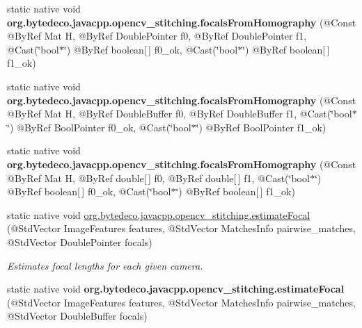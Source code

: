 \begin{DoxyCompactItemize}
static native void {\bfseries org.\+bytedeco.\+javacpp.\+opencv\+\_\+stitching.\+focals\+From\+Homography} (@Const @By\+Ref Mat H, @By\+Ref Double\+Pointer f0, @By\+Ref Double\+Pointer f1, @Cast(\char`\"{}bool$\ast$\char`\"{}) @By\+Ref boolean\mbox{[}$\,$\mbox{]} f0\+\_\+ok, @Cast(\char`\"{}bool$\ast$\char`\"{}) @By\+Ref boolean\mbox{[}$\,$\mbox{]} f1\+\_\+ok)
\item 
\mbox{\label{group__stitching__autocalib_gafa29da1319ecdb20e635b02ee21b11b6}} 
static native void {\bfseries org.\+bytedeco.\+javacpp.\+opencv\+\_\+stitching.\+focals\+From\+Homography} (@Const @By\+Ref Mat H, @By\+Ref Double\+Buffer f0, @By\+Ref Double\+Buffer f1, @Cast(\char`\"{}bool$\ast$\char`\"{}) @By\+Ref Bool\+Pointer f0\+\_\+ok, @Cast(\char`\"{}bool$\ast$\char`\"{}) @By\+Ref Bool\+Pointer f1\+\_\+ok)
\item 
\mbox{\label{group__stitching__autocalib_gaedbd40d8f939bbd801b1418c72eea13d}} 
static native void {\bfseries org.\+bytedeco.\+javacpp.\+opencv\+\_\+stitching.\+focals\+From\+Homography} (@Const @By\+Ref Mat H, @By\+Ref double\mbox{[}$\,$\mbox{]} f0, @By\+Ref double\mbox{[}$\,$\mbox{]} f1, @Cast(\char`\"{}bool$\ast$\char`\"{}) @By\+Ref boolean\mbox{[}$\,$\mbox{]} f0\+\_\+ok, @Cast(\char`\"{}bool$\ast$\char`\"{}) @By\+Ref boolean\mbox{[}$\,$\mbox{]} f1\+\_\+ok)
\item 
static native void \hyperlink{group__stitching__autocalib_gab7c6c88fc60a136eb6f9faa46a32e660}{org.\+bytedeco.\+javacpp.\+opencv\+\_\+stitching.\+estimate\+Focal} (@Std\+Vector Image\+Features features, @Std\+Vector Matches\+Info pairwise\+\_\+matches, @Std\+Vector Double\+Pointer focals)
\begin{DoxyCompactList}\small\item\em Estimates focal lengths for each given camera. \end{DoxyCompactList}\item 
\mbox{\label{group__stitching__autocalib_ga0bb382aece7dec6ae979910b22a94b01}} 
static native void {\bfseries org.\+bytedeco.\+javacpp.\+opencv\+\_\+stitching.\+estimate\+Focal} (@Std\+Vector Image\+Features features, @Std\+Vector Matches\+Info pairwise\+\_\+matches, @Std\+Vector Double\+Buffer focals)
\item 
\mbox{\label{group__stitching__autocalib_ga6f03c7a0be4f4a0cc0a2b3eb76325f7d}} 

\end{DoxyCompactItemize}
